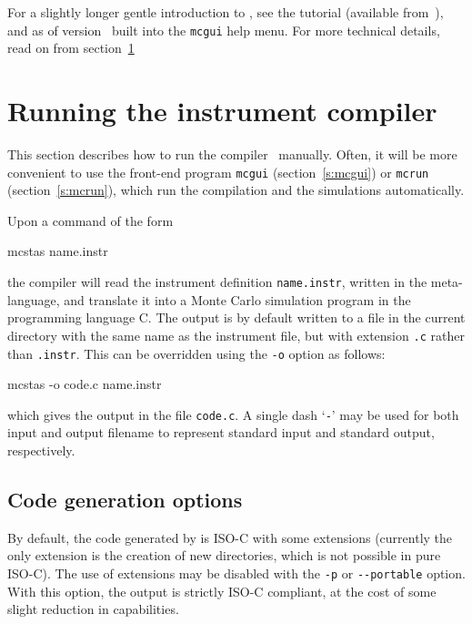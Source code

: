 For a slightly longer gentle introduction to \MCS, see the \MCS tutorial
(available from~\cite{mcstas_webpage}), and as of version \version\ built into
the \verb+mcgui+ help menu. For more technical details, read on from
section~\ref{s:running}



\section{Running the instrument compiler}
\label{s:running}

This section describes how to run the \MCS compiler \mcs\ manually. Often,
it will be more convenient to use the front-end program \verb+mcgui+
(section~\ref{s:mcgui}) or \verb+mcrun+ (section~\ref{s:mcrun}),
which run the compilation and the simulations automatically.

Upon a command of the form
\begin{bash}
    mcstas name.instr
\end{bash}
the compiler \mcs will read the instrument definition \verb+name.instr+,
written in the \MCS meta-language,
and translate it into a Monte Carlo simulation program in
the programming language C.
The output is by default written to a file in the current
directory with the same name as the instrument file, but with extension
\verb+.c+ rather than \verb+.instr+. This can be overridden using the
\verb+-o+ option as follows:
\begin{bash}
    mcstas -o code.c name.instr
\end{bash}
which gives the output in the file \verb+code.c+.
A single dash `\verb+-+' may be used for both input and output filename
to represent standard input and standard output, respectively.


\subsection{Code generation options}

By default, the code generated by \mcs is ISO-C with
some extensions (currently the only extension is the creation of new
directories, which is not possible in pure ISO-C). The use of
extensions may be disabled with the \verb+-p+ or \verb+--portable+
option. With this option, the output is strictly ISO-C compliant, at
the cost of some slight reduction in capabilities.

